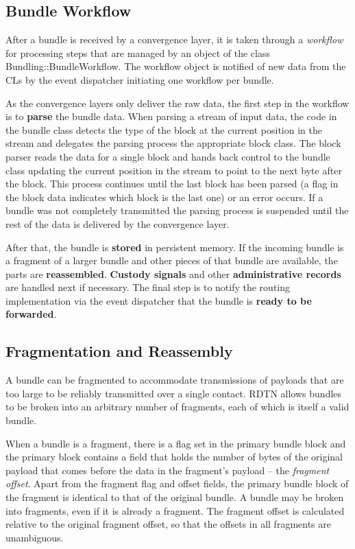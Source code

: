 \documentclass{article}
\begin{document}
\subsection{Bundle Workflow}\label{sec.workflow}

After a bundle is received by a convergence layer, it is taken through a
{\em workflow} for processing steps that are managed by an object of the class
Bundling::BundleWorkflow. The workflow object is notified of new data from the
CLs by the event dispatcher initiating one workflow per bundle.

As the convergence layers only deliver the raw data, the first step in the
workflow is to {\bf parse} the bundle data.  When parsing a stream of input
data, the code in the bundle class detects the type of the block at the current
position in the stream and delegates the parsing process the appropriate block
class. The block parser reads the data for a single block and hands back control
to the bundle class updating the current position in the stream to point to the
next byte after the block. This process continues until the last block has been
parsed (a flag in the block data indicates which block is the last one) or an
error occurs. If a bundle was not completely transmitted the parsing process is
suspended until the rest of the data is delivered by the convergence layer.

After that, the bundle is {\bf stored} in persistent memory. If the incoming
bundle is a fragment of a larger bundle and other pieces of that bundle are
available, the parts are {\bf reassembled}. {\bf Custody signals} and other {\bf
administrative records} are handled next if necessary. The final step is to
notify the routing implementation via the event dispatcher that the bundle is
{\bf ready to be forwarded}.

\subsection{Fragmentation and Reassembly}\label{sec.frag}

A bundle can be fragmented to accommodate transmissions of payloads that are too
large to be reliably transmitted over a single contact. RDTN allows bundles to
be broken into an arbitrary number of fragments, each of which is itself a valid
bundle. 

When a bundle is a fragment, there is a flag set in the primary bundle block and
the primary block contains a field that holds the number of bytes of the
original payload that comes before the data in the fragment's payload -- the
{\em fragment offset}. Apart from the fragment flag and offset fields, the
primary bundle block of the fragment is identical to that of the original
bundle. A bundle may be broken into fragments, even if it is already a fragment.
The fragment offset is calculated relative to the original fragment offset, so
that the offsets in all fragments are unambiguous.
\end{document}
